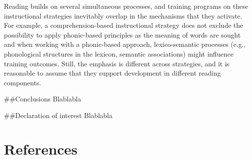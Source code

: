 \documentclass[
  ,
]{article}
\newlength{\cslhangindent}
\newlength{\cslentryspacingunit} %
\newenvironment{CSLReferences}[2] %
 {%
  \setlength{\parindent}{0pt}
  \ifodd #1
  \let\oldpar\par
  \def\par{\hangindent=\cslhangindent\oldpar}
  \fi
  \setlength{\parskip}{#2\cslentryspacingunit}
 }%
 {}
\begin{document}
Reading builds on several simultaneous processes, and training programs
on these instructional strategies inevitably overlap in the mechanisms
that they activate. For example, a comprehension-based instructional
strategy does not exclude the possibility to apply phonic-based
principles as the meaning of words are sought and when working with a
phonic-based approach, lexico-semantic processes (e.g., phonological
structures in the lexicon, semantic associations) might influence
training outcomes. Still, the emphasis is different across strategies,
and it is reasonable to assume that they support development in
different reading components.

\#\#Conclusions Blablabla

\#\#Declaration of interest Blablabla

\newpage

\hypertarget{references}{%
\section{References}\label{references}}

\begingroup
\setlength{\parindent}{-0.5in}
\setlength{\leftskip}{0.5in}

\hypertarget{refs}{}
\begin{CSLReferences}{0}{0}
\end{CSLReferences}

\endgroup
\end{document}

